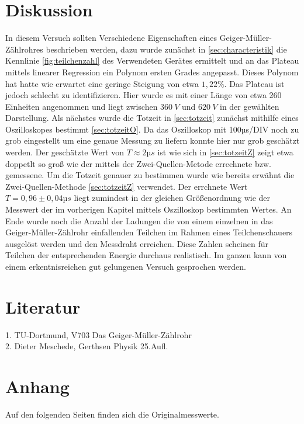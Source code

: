 \section{Diskussion}
\label{sec:diskussion}
In diesem Versuch sollten Verschiedene Eigenschaften eines Geiger-Müller-Zählrohres beschrieben werden, dazu 
wurde zunächst in \autoref{sec:characteristik} die Kennlinie \autoref{fig:teilchenzahl} 
des Verwendeten Gerätes ermittelt und an das Plateau mittels linearer Regression ein Polynom ersten Grades 
angepasst. Dieses Polynom hat hatte wie erwartet eine geringe Steigung von etwa $1,22\%$. Das Plateau ist 
jedoch schlecht zu identifizieren. Hier wurde es mit einer Länge von etwa 260 Einheiten angenommen und liegt 
zwischen $\SI{360}{V}$ und $\SI{620}{V}$ in der gewählten Darstellung. Als nächstes wurde die Totzeit in 
\autoref{sec:totzeit} zunächst mithilfe eines Oszilloskopes bestimmt \autoref{sec:totzeitO}. Da das Oszilloskop
mit 100µs/DIV noch zu grob eingestellt um eine genaue Messung zu liefern konnte hier nur grob geschätzt werden.
Der geschätzte Wert von $T\approx 2µs$ ist wie sich in \autoref{sec:totzeitZ} zeigt etwa doppetlt so groß wie
der mittels der Zwei-Quellen-Metode errechnete bzw. gemessene. Um die Totzeit genauer zu bestimmen wurde wie 
bereits erwähnt die Zwei-Quellen-Methode \autoref{sec:totzeitZ} verwendet. Der errchnete Wert $T=0,96\pm0,04µs$
liegt zumindest in der gleichen Größenordnung wie der Messwert der im vorherigen Kapitel mittels Oszilloskop 
bestimmten Wertes. An Ende wurde noch die Anzahl der Ladungen die von einem einzelnen in das Geiger-Müller-Zählrohr
einfallenden Teilchen im Rahmen eines Teilchenschauers ausgelöst werden und den Messdraht erreichen. Diese
Zahlen scheinen für Teilchen der entsprechenden Energie durchaus realistisch. Im ganzen kann von einem 
erkentnisreichen gut gelungenen Versuch gesprochen werden.

\section{Literatur}
\label{sec:literatur}
1. TU-Dortmund, V703 Das Geiger-Müller-Zählrohr\\
2. Dieter Meschede, Gerthsen Physik 25.Aufl.

\section{Anhang}
\label{sec:anhang}
Auf den folgenden Seiten finden sich die Originalmesswerte.
